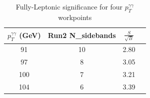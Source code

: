 
\begin{table}[!htbp]
\begin{center}
  \begin{tabular}{c|c|c|c}
    $p_T^{\gamma\gamma}$ (GeV) & Run2 N_{sidebands} & $\frac{S}{\sqrt{B}}$   \\ \hline
    91 & 10 & 2.80  \\
    97 & 8 & 3.05   \\
    100 & 7 & 3.21   \\
    104 & 6 & 3.39  \\
  \end{tabular}
  \end{center}
\caption{
Fully-Leptonic significance for four $p_T^{\gamma\gamma}$ workpoints
}
\label{tab:DiphoPt}
\end{table}

